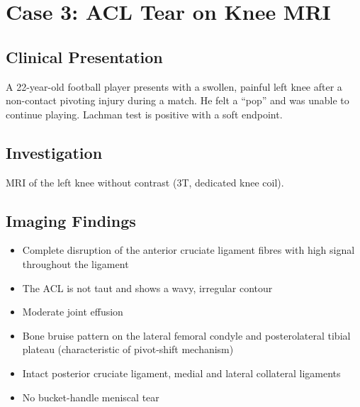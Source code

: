 \clearpage

\section{Case 3: ACL Tear on Knee MRI}

\subsection{Clinical Presentation}
A 22-year-old football player presents with a swollen, painful left knee after a non-contact pivoting injury during a match. He felt a ``pop'' and was unable to continue playing. Lachman test is positive with a soft endpoint.

\subsection{Investigation}
MRI of the left knee without contrast (3T, dedicated knee coil).

\subsection{Imaging Findings}
\begin{itemize}
    \item Complete disruption of the anterior cruciate ligament fibres with high signal throughout the ligament
    \item The ACL is not taut and shows a wavy, irregular contour
    \item Moderate joint effusion
    \item Bone bruise pattern on the lateral femoral condyle and posterolateral tibial plateau (characteristic of pivot-shift mechanism)
    \item Intact posterior cruciate ligament, medial and lateral collateral ligaments
    \item No bucket-handle meniscal tear
\end{itemize}

